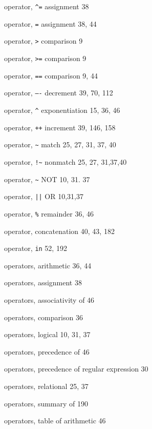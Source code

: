 \begin{multicols}{3}
\hangindent=3pc  operator, \verb'^=' assignment 38

\hangindent=3pc  operator, \verb'=' assignment 38, 44

\hangindent=3pc  operator, \verb'>' comparison 9

\hangindent=3pc  operator, \verb'>=' comparison 9

\hangindent=3pc  operator, \verb'==' comparison 9, 44

\hangindent=3pc  operator, \verb'—-' decrement 39, 70, 112

\hangindent=3pc  operator, \verb'^' exponentiation 15, 36, 46

\hangindent=3pc  operator, \verb'++' increment 39, 146, 158

\hangindent=3pc  operator, \verb'~' match 25, 27, 31, 37, 40

\hangindent=3pc  operator, \verb'!~' nonmatch 25, 27, 31,37,40

\hangindent=3pc  operator, \verb'~' NOT 10, 31. 37

\hangindent=3pc  operator, \verb'||' OR 10,31,37

\hangindent=3pc  operator, \verb'%' remainder 36, 46

\hangindent=3pc  operator, concatenation 40, 43,  182

\hangindent=3pc  operator, \verb'in' 52, 192

\hangindent=3pc  operators, arithmetic 36, 44

\hangindent=3pc  operators, assignment 38

\hangindent=3pc  operators, associativity of 46

\hangindent=3pc  operators, comparison 36

\hangindent=3pc  operators, logical 10, 31, 37

\hangindent=3pc  operators, precedence of 46

\hangindent=3pc  operators, precedence of regular expression 30

\hangindent=3pc  operators, relational 25, 37

\hangindent=3pc  operators, summary of 190

\hangindent=3pc  operators, table of arithmetic 46


\end{multicols}
